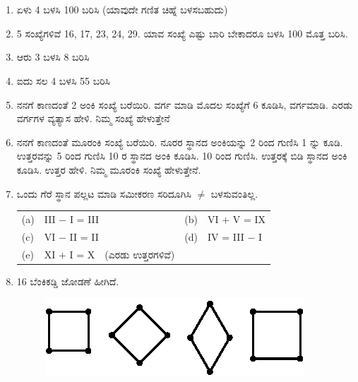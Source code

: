 \chapter{}\label{chap5}

\begin{enumerate}
\renewcommand{\labelenumi}{\bf\theenumi.}
\itemsep=5pt

\item ಏಳು 4 ಬಳಸಿ 100 ಬರಿಸಿ (ಯಾವುದೇ ಗಣಿತ ಚಿಹ್ನೆ ಬಳಸಬಹುದು)

\item 5 ಸಂಖ್ಯೆಗಳಿವೆ 16, 17, 23, 24, 29. ಯಾವ ಸಂಖ್ಯೆ ಎಷ್ಟು ಬಾರಿ ಬೇಕಾದರೂ ಬಳಸಿ 100 ಮೊತ್ತ ಬರಿಸಿ.  

\item ಆರು 3 ಬಳಸಿ 8 ಬರಿಸಿ

\item ಐದು ಸಲ 4 ಬಳಸಿ 55 ಬರಿಸಿ 

\item ನನಗೆ ಕಾಣದಂತೆ 2 ಅಂಕಿ ಸಂಖ್ಯೆ ಬರೆಯಿರಿ. ವರ್ಗ ಮಾಡಿ ಮೊದಲ ಸಂಖ್ಯೆಗೆ 6 ಕೂಡಿಸಿ, ವರ್ಗಮಾಡಿ. ಎರಡು ವರ್ಗಗಳ ವ್ಯತ್ಯಾಸ ಹೇಳಿ. ನಿಮ್ಮ ಸಂಖ್ಯೆ ಹೇಳುತ್ತೇನೆ

\item ನನಗೆ ಕಾಣದಂತೆ ಮೂರಂಕಿ ಸಂಖ್ಯೆ ಬರೆಯಿರಿ. ನೂರರ ಸ್ಥಾನದ ಅಂಕಿಯನ್ನು 2 ರಿಂದ ಗುಣಿಸಿ 1 ನ್ನು ಕೂಡಿ. ಉತ್ತರವನ್ನು 5 ರಿಂದ ಗುಣಿಸಿ 10 ರ ಸ್ಥಾನದ ಅಂಕಿ ಕೂಡಿಸಿ. 10 ರಿಂದ ಗುಣಿಸಿ. ಉತ್ತರಕ್ಕೆ ಬಿಡಿ ಸ್ಥಾನದ ಅಂಕಿ ಕೂಡಿಸಿ. ಉತ್ತರ ಹೇಳಿ. ನಿಮ್ಮ ಮೂರಂಕಿ ಸಂಖ್ಯೆ ಹೇಳುತ್ತೇನೆ.

\item ಒಂದು ಗೆರೆ ಸ್ಥಾನ ಪಲ್ಲಟ ಮಾಡಿ ಸಮೀಕರಣ ಸರಿದೂಗಿಸಿ $\neq$ ಬಳಸುವಂತಿಲ್ಲ.

\begin{tabular}{llll}
(a)& III $-$ I = III &(b) & VI $+$ V = IX\\
(c)& VI $-$ II = II &(d) & IV = III $-$ I\\
(e)& XI $+$ I = X~~(ಎರಡು ಉತ್ತರಗಳಿವೆ) & &
\end{tabular}

\item 16 ಬೆಂಕಿಕಡ್ಡಿ ಜೋಡಣೆ ಹೀಗಿದೆ.

\begin{figure}[!h]
\centering
\includegraphics{images/chap5/q8.eps}
\end{figure} 


\end{enumerate}
